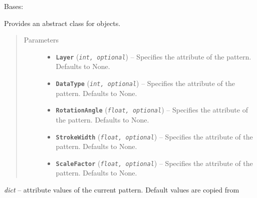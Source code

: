 \documentclass[letterpaper,10pt,english]{sphinxmanual}
\begin{document}

\begin{fulllineitems}
\label{Chapters/PythonModuleReference/Patterns/TXLWizard.Patterns.AbstractPattern:TXLWizard.Patterns.AbstractPattern.AbstractPattern}
Bases: 

Provides an abstract class for  objects.
\begin{quote}\begin{description}
\item[{Parameters}] \leavevmode\begin{itemize}
\item {} 
\textbf{\texttt{Layer}} (\emph{\texttt{int, optional}}) -- Specifies the  attribute of the pattern.
Defaults to None.

\item {} 
\textbf{\texttt{DataType}} (\emph{\texttt{int, optional}}) -- Specifies the  attribute of the pattern.
Defaults to None.

\item {} 
\textbf{\texttt{RotationAngle}} (\emph{\texttt{float, optional}}) -- Specifies the  attribute of the pattern.
Defaults to None.

\item {} 
\textbf{\texttt{StrokeWidth}} (\emph{\texttt{float, optional}}) -- Specifies the  attribute of the pattern.
Defaults to None.

\item {} 
\textbf{\texttt{ScaleFactor}} (\emph{\texttt{float, optional}}) -- Specifies the  attribute of the pattern.
Defaults to None.

\end{itemize}

\end{description}\end{quote}

\begin{fulllineitems}
\label{Chapters/PythonModuleReference/Patterns/TXLWizard.Patterns.AbstractPattern:TXLWizard.Patterns.AbstractPattern.AbstractPattern.Attributes}
\emph{dict} -- attribute values of the current pattern. Default values are copied from 


\end{fulllineitems}
\end{fulllineitems}
\end{document}
